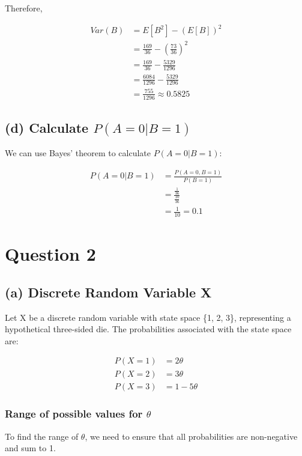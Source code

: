 \documentclass{article}
\begin{document}
Therefore,

\begin{align*}
Var(B) &= E[B^2] - (E[B])^2 \\
&= \frac{169}{36} - (\frac{73}{36})^2 \\
&= \frac{169}{36} - \frac{5329}{1296} \\
&= \frac{6084}{1296} - \frac{5329}{1296} \\
&= \frac{755}{1296} \approx 0.5825
\end{align*}

\subsection*{(d) Calculate $P(A = 0|B = 1)$}

We can use Bayes' theorem to calculate $P(A = 0|B = 1)$:

\begin{align*}
P(A = 0|B = 1) &= \frac{P(A = 0, B = 1)}{P(B = 1)} \\
&= \frac{\frac{1}{36}}{\frac{10}{36}} \\
&= \frac{1}{10} = 0.1
\end{align*}

\section*{Question 2}

\subsection*{(a) Discrete Random Variable X}

Let X be a discrete random variable with state space \{1, 2, 3\}, representing a hypothetical three-sided die. The probabilities associated with the state space are:

\begin{align*}
P(X = 1) &= 2\theta \\
P(X = 2) &= 3\theta \\
P(X = 3) &= 1 - 5\theta
\end{align*}

\subsubsection*{Range of possible values for $\theta$}

To find the range of $\theta$, we need to ensure that all probabilities are non-negative and sum to 1.
\end{document}
